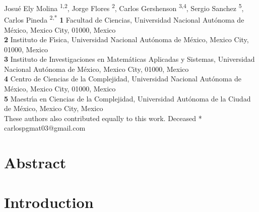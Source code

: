 \documentclass[10pt,letterpaper]{article} %
\begin{document}
\vspace*{0.2in}

\begin{flushleft}
{\Large
	\textbf{} %
}
\newline
Josué Ely Molina  \ddag\textsuperscript{1,2}, %
Jorge Flores      \dag \textsuperscript{2}, %
Carlos Gershenson \textsuperscript{3,4},
Sergio Sanchez    \textsuperscript{5},
Carlos Pineda     \ddag\textsuperscript{2,*}    %
% 
\bigskip
\newcommand{\unam}{Universidad Nacional Aut\'{o}noma de M\'{e}xico, Mexico City, 01000, Mexico}
\textbf{1} Facultad de Ciencias, \unam \\
\textbf{2} Instituto de F\'{\i}sica, \unam \\
\textbf{3} Instituto de Investigaciones en Matem\'{a}ticas Aplicadas y Sistemas, \unam \\
\textbf{4} Centro de Ciencias de la Complejidad, \unam \\
\textbf{5} 
Maestr\'{\i}a en Ciencias de la Complejidad, 
Universidad Aut\'{o}noma de la Ciudad de M\'{e}xico,
Mexico City, Mexico
\\
\bigskip
\ddag These authors also contributed equally to this work.
\dag Deceased
* carlospgmat03@gmail.com
\end{flushleft}
\section*{Abstract} %


\section*{Introduction} %

\end{document}
